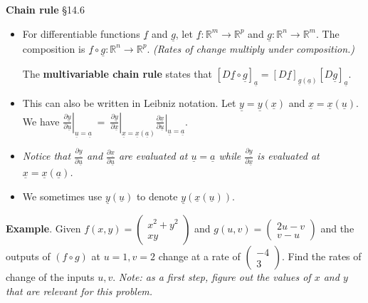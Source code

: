 \documentclass[12pt,letterpaper,noanswers]{exam}
\newcommand{\mb}[1]{\underline{#1}}
\begin{document}
\noindent\textbf{Chain rule} \S 14.6
\begin{tcolorbox}
\begin{itemize}
\itemsep0em
    \item For differentiable functions $\mb{f}$ and $\mb{g}$, let $\mb{f}: \mathbb{R}^m \rightarrow \mathbb{R}^p$ and $\mb{g}: \mathbb{R}^n\rightarrow\mathbb{R}^m$.  The composition is $\mb{f} \circ \mb{g}: \mathbb{R}^n\rightarrow\mathbb{R}^p$. \emph{(Rates of change multiply under composition.)}
    
    The \textbf{multivariable chain rule} states that $[D \mb f\circ \mb g]_{\mb{a}} = [D\mb f]_{\mb{g}(\mb{a})}[D\mb g]_{\mb{a}}$.
    
\item This can also be written in Leibniz notation.  Let $\mb{y} = \mb{y}(\mb{x})$ and $\mb{x} = \mb{x}(\mb{u})$.  We have    
    $\displaystyle\left.\frac{\partial\mb{y}}{\partial\mb{u}}\right\vert_{\mb{u}=\mb{a}}~=~\left.\frac{\partial\mb{y}}{\partial\mb{x}}\right\vert_{\mb{x}=\mb{x}(\mb{a})}\left.\frac{\partial\mb{x}}{\partial\mb{u}}\right\vert_{\mb{u}=\mb{a}}$.  
    \item \emph{Notice that $\frac{\partial\mb{y}}{\partial\mb{u}}$ and $\frac{\partial\mb{x}}{\partial\mb{u}}$ are evaluated at $\mb{u} = \mb{a}$ while $\frac{\partial\mb{y}}{\partial\mb{x}}$ is evaluated at $\mb{x} = \mb{x}(\mb{a})$.}
    \item We sometimes use $\mb{y}(\mb{u})$ to denote $\mb{y}(\mb{x}(\mb{u}))$.
    \end{itemize}
    \end{tcolorbox}
    
    \noindent\textbf{Example}. Given $f(x,y) = \left(\begin{array}{c} x^2+y^2 \\ xy \end{array}\right)$ and $g(u,v) = \left(\begin{array}{c} 2u - v \\ v-u \end{array}\right)$ and the outputs of $(f \circ g)$ at $u=1, v=2$ change at a rate of $\left(\begin{array}{c} -4 \\ 3 \end{array}\right)$.  Find the rates of change of the inputs $u, v$.  \emph{Note: as a first step, figure out the values of $x$ and $y$ that are relevant for this problem.}
    
    \vspace{2.5in}
    
\end{document}
